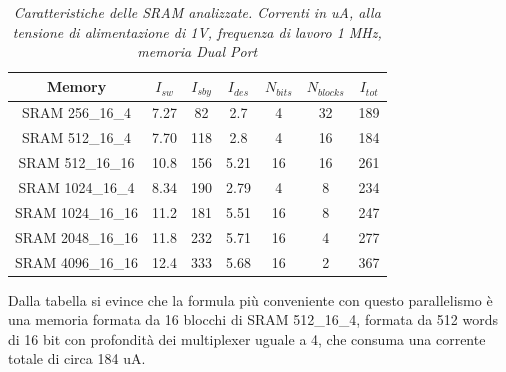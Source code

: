 \begin{table}[!h]\footnotesize
	\centering
	\begin{tabular}{|c|cccccc|}
		\hline
		\textbf{Memory} & \textbf{$I_{sw}$}& \textbf{$I_{sby}$} & \textbf{$I_{des}$} & \textbf{$N_{bits}$} & \textbf{$N_{blocks}$} &
		\textbf{$I_{tot}$}
		\\
		\hline
		SRAM 256\_16\_4 & 7.27 & 82 &2.7 & 4 & 32 & 189\\
		SRAM 512\_16\_4 & 7.70 & 118 & 2.8 &  4 & 16 & 184\\
		SRAM 512\_16\_16 & 10.8 & 156 & 5.21 & 16 & 16 & 261\\
		SRAM 1024\_16\_4 & 8.34 & 190 & 2.79 & 4 & 8 & 234\\
		SRAM 1024\_16\_16 & 11.2 & 181 & 5.51 & 16 & 8 & 247\\
		SRAM 2048\_16\_16 & 11.8 & 232 & 5.71 & 16 & 4 & 277\\
		SRAM 4096\_16\_16 & 12.4 & 333 & 5.68 & 16  & 2 & 367\\
		\hline
	\end{tabular}
	\caption{\textit{Caratteristiche delle SRAM analizzate. Correnti in uA, alla tensione di alimentazione di 1V, frequenza di lavoro 1 MHz, memoria Dual Port}}
	\label{Tab5_25}
\end{table}

Dalla tabella si evince che la formula più conveniente con questo parallelismo è una memoria formata da 16 blocchi di  SRAM 512\_16\_4, formata da 512  words  di 16 bit con profondità dei multiplexer uguale a 4, che consuma una corrente totale di circa 184 uA.
